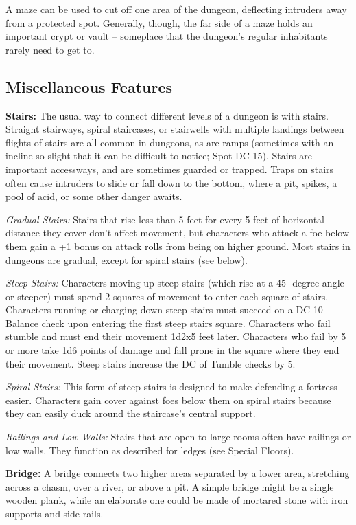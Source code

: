 A maze can be used to cut off one area of the dungeon, deflecting intruders away from a protected spot. Generally, though, the far side of a maze holds an important crypt or vault -- someplace that the dungeon's regular inhabitants rarely need to get to.

\subsection{Miscellaneous Features}

\textbf{Stairs:} The usual way to connect different levels of a dungeon is with stairs. Straight stairways, spiral staircases, or stairwells with multiple landings between flights of stairs are all common in dungeons, as are ramps (sometimes with an incline so slight that it can be difficult to notice; Spot DC 15). Stairs are important accessways, and are sometimes guarded or trapped. Traps on stairs often cause intruders to slide or fall down to the bottom, where a pit, spikes, a pool of acid, or some other danger awaits.

\textit{Gradual Stairs:} Stairs that rise less than 5 feet for every 5 feet of horizontal distance they cover don't affect movement, but characters who attack a foe below them gain a +1 bonus on attack rolls from being on higher ground. Most stairs in dungeons are gradual, except for spiral stairs (see below).

\textit{Steep Stairs:} Characters moving up steep stairs (which rise at a 45- degree angle or steeper) must spend 2 squares of movement to enter each square of stairs. Characters running or charging down steep stairs must succeed on a DC 10 Balance check upon entering the first steep stairs square. Characters who fail stumble and must end their movement 1d2x5 feet later. Characters who fail by 5 or more take 1d6 points of damage and fall prone in the square where they end their movement. Steep stairs increase the DC of Tumble checks by 5.

\textit{Spiral Stairs:} This form of steep stairs is designed to make defending a fortress easier. Characters gain cover against foes below them on spiral stairs because they can easily duck around the staircase's central support.

\textit{Railings and Low Walls:} Stairs that are open to large rooms often have railings or low walls. They function as described for ledges (see Special Floors).

\textbf{Bridge:} A bridge connects two higher areas separated by a lower area, stretching across a chasm, over a river, or above a pit. A simple bridge might be a single wooden plank, while an elaborate one could be made of mortared stone with iron supports and side rails.

